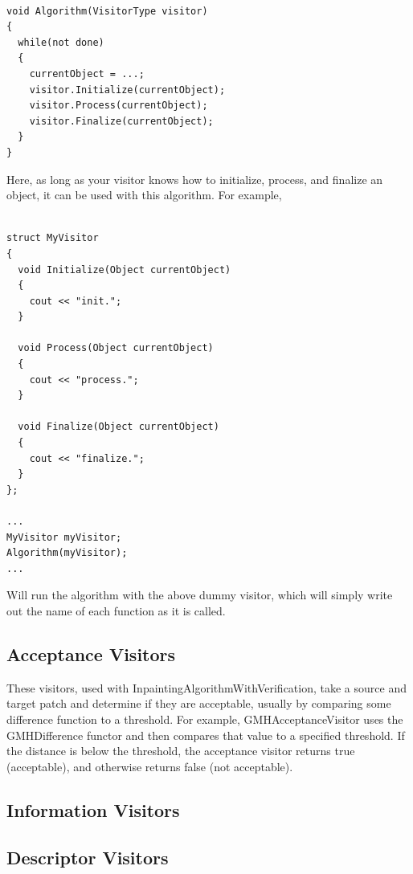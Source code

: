 \documentclass{InsightArticle}
\begin{document}
\begin{verbatim}
 
void Algorithm(VisitorType visitor)
{
  while(not done)
  {
    currentObject = ...;
    visitor.Initialize(currentObject);
    visitor.Process(currentObject);
    visitor.Finalize(currentObject);
  }
}
\end{verbatim}

Here, as long as your visitor knows how to initialize, process, and finalize an object, it can be used with this algorithm. For example,

\begin{verbatim}
 
struct MyVisitor
{
  void Initialize(Object currentObject)
  {
    cout << "init.";
  }

  void Process(Object currentObject)
  {
    cout << "process.";
  }

  void Finalize(Object currentObject)
  {
    cout << "finalize.";
  }
};

...
MyVisitor myVisitor;
Algorithm(myVisitor);
...

\end{verbatim}

Will run the algorithm with the above dummy visitor, which will simply write out the name of each function as it is called.

\subsection{Acceptance Visitors}
These visitors, used with InpaintingAlgorithmWithVerification, take a source and target patch and determine if they are acceptable, usually by comparing some difference function to a threshold. For example, GMHAcceptanceVisitor uses the GMHDifference functor and then compares that value to a specified threshold. If the distance is below the threshold, the acceptance visitor returns true (acceptable), and otherwise returns false (not acceptable).

\subsection{Information Visitors}
\subsection{Descriptor Visitors}

\end{document}
